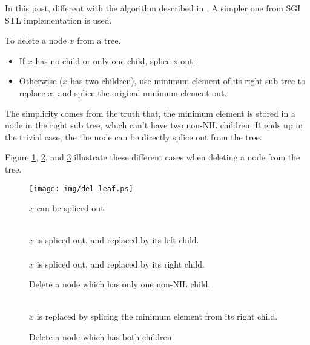 \documentclass[UTF8]{article}
\begin{document}
In this post, different with the algorithm described in \cite{CLRS},
A simpler one from SGI STL implementation is used.\cite{sgi-stl}

To delete a node $x$ from a tree.
\begin{itemize}
\item If $x$ has no child or only one child, splice x out;
\item Otherwise ($x$ has two children), use minimum element of its right sub tree to replace $x$, and splice the original minimum element out.
\end{itemize}

The simplicity comes from the truth that, the minimum element is stored
in a node in the right sub tree, which can't have two non-NIL children.
It ends up in the trivial case, the the node can be directly splice
out from the tree.

Figure \ref{fig:del-leaf}, \ref{fig:del-1child}, and \ref{fig:del-branch}
illustrate these different cases when deleting a node from the tree.

\begin{figure}[htbp]
       \begin{center}
	\texttt{[image: img/del-leaf.ps]}
        \caption{$x$ can be spliced out.} \label{fig:del-leaf}
       \end{center}
\end{figure}

\begin{figure}[htbp]
        \centering
         \\
        $x$ is spliced out, and replaced by its left child. \\
         \\
        $x$ is spliced out, and replaced by its right child.
        \caption{Delete a node which has only one non-NIL child.}
        \label{fig:del-1child}
\end{figure}

\begin{figure}[htbp]
        \centering
         \\
        $x$ is replaced by splicing the minimum element from its right child.
        \caption{Delete a node which has both children.}
        \label{fig:del-branch}
\end{figure}
\end{document}
